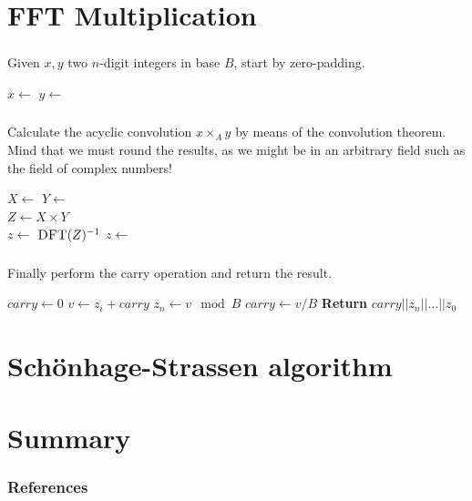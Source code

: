 \documentclass{beamer}
\begin{document}
\section{FFT Multiplication}

\begin{frame}
		\frametitle{\secname}

		Given $x, y$ two $n$-digit integers in base $B$, start by zero-padding.

		\begin{algorithmic}[1]
				 
				\State $x \gets$  
				\State $y \gets$ 
		\end{algorithmic}
\end{frame}

\begin{frame}
		\frametitle{\secname}

		Calculate the acyclic convolution $x \times_A y$ by means of the
		convolution theorem. Mind that we must round the results, as we might
		be in an arbitrary field such as the field of complex numbers!

		\begin{algorithmic}[1]
				\State $X \gets$ 
				\State $Y \gets$ 
				\\
				\State $Z \gets X \times Y$ 
				\\
				\State $z \gets$ $\Call{DFT}{Z}^{-1}$
				\State $z \gets$ 
		\end{algorithmic}
\end{frame}

\begin{frame}
		\frametitle{\secname}

		Finally perform the carry operation and return the result.

		\begin{algorithmic}[1]
				\State $carry \gets 0$
				  \State $v \gets z_i + carry$
				  \State $z_n \gets v \mod B$
				  \State $carry \gets v / B$ 
				\EndFor
				\State \textbf{Return} $carry || z_n || \ldots || z_0$ 
				\EndFunction
		\end{algorithmic}
\end{frame}

\section{Schönhage-Strassen algorithm}

\section{Summary}

\begin{frame}
		\frametitle{References}
		\printbibliography
\end{frame}
\end{document}
